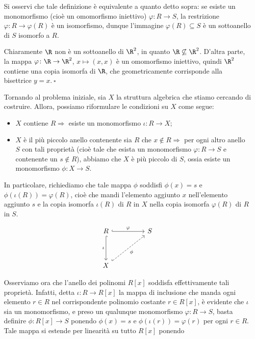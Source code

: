 \noindent Si osservi che tale definizione è equivalente a quanto detto sopra: se esiste un monomorfismo 
(cioè un omomorfismo iniettivo) $\varphi\colon R\to S$, la restrizione $\varphi\colon R\to \varphi(R)$ è un isomorfismo, 
dunque l'immagine $\varphi(R)\subseteq S$ è un sottoanello di $S$ isomorfo a $R$.

\begin{exm}
Chiaramente $\R$ non è un sottoanello di $\R^2$, in quanto $\R\not\subseteq \R^2$. D'altra parte, la mappa 
$\varphi\colon \R\to \R^2$, $x\mapsto (x,x)$ è un omomorfismo iniettivo, quindi $\R^2$ contiene una copia isomorfa di $\R$, 
che geometricamente corrisponde alla bisettrice $y=x. \ \square$\end{exm}

\noindent Tornando al problema iniziale, sia $X$ la struttura algebrica che stiamo cercando di costruire. 
Allora, possiamo riformulare le condizioni su $X$ come segue:

\begin{itemize}
\item $X$ contiene $R\Rightarrow$ esiste un monomorfismo $\iota\colon R\to X$;
\item $X$ è il più piccolo anello contenente sia $R$ che $x\notin R\Rightarrow$ per ogni altro anello $S$ 
con tali proprietà (cioè tale che esista un monomorfismo $\varphi\colon R\to S$ e contenente un $s\notin R$), 
abbiamo che $X$ è più piccolo di $S$, ossia esiste un monomorfismo $\phi\colon X\to S$. 
\end{itemize}

In particolare, richiediamo che tale mappa $\phi$ soddisfi $\phi(x)=s$ e $\phi(\iota(R))=\varphi(R)$, 
cioè che mandi l'elemento aggiunto $x$ nell'elemento aggiunto $s$ e la copia isomorfa $\iota(R)$ di $R$ in $X$ 
nella copia isomorfa $\varphi(R)$ di $R$ in $S$.

\[
\begin{tikzcd}
R \arrow[rr, "\varphi", hook] \arrow[dd, "\iota"', hook] &  & S \\
                                                         &  &   \\
X \arrow[rruu, "\phi"', dashed, hook]                    &  &  
\end{tikzcd}
\]

\noindent Osserviamo ora che l'anello dei polinomi $R[x]$ soddisfa effettivamente tali proprietà. 
Infatti, detta $\iota\colon R\to R[x]$ la mappa di inclusione che manda ogni elemento $r\in R$ 
nel corrispondente polinomio costante $r\in R[x]$, è evidente che $\iota$ sia un monomorfismo, 
e preso un qualunque monomorfismo $\varphi\colon R\to S$, basta definire $\phi\colon R[x]\to S$ 
ponendo $\phi(x)=s$ e $\phi(\iota(r))=\varphi(r)$ per ogni $r\in R$. 
Tale mappa si estende per linearità su tutto $R[x]$ ponendo 

